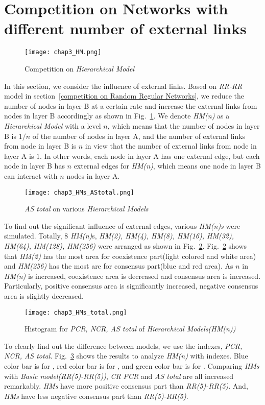 \section{Competition on Networks with different number of external links}
\begin{figure}[!htb]
	\centering
	\texttt{[image: chap3\_HM.png]}
	\caption{Competition on \textit{Hierarchical Model}}
	\label{chap3_HM}
\end{figure}
In this section, we consider the influence of external links. Based on \textit{RR-RR} model in section~\ref{competition on Random Regular Networks}, we reduce the number of nodes in layer B at a certain rate and increase the external links from nodes in layer B accordingly as shown in Fig.~\ref{chap3_HM}.  We denote \textit{HM(n)} as a \textit{Hierarchical Model} with a level $n$, which means that the number of nodes in layer B is $1/n$ of the number of nodes in layer A, and the number of external links from node in layer B is $n$ in view that the number of external links from node in layer A is $1$. In other words, each node in layer A has one external edge, but each node in layer B has $n$ external edges for \textit{HM(n)}, which means one node in layer B can interact with $n$ nodes in layer A.\\
\begin{figure}[!htb]
	\centering
	\texttt{[image: chap3\_HMs\_AStotal.png]}
	\caption{\textit{AS total} on various \textit{Hierarchical Models}}
	\label{chap3_HMs_AStotal}
\end{figure}
To find out the significant influence of external edges, various \textit{HM(n)s} were simulated.  Totally, $8$ \textit{HM(n)}s, \textit{HM(2), HM(4), HM(8), HM(16), HM(32), HM(64), HM(128), HM(256)} were arranged as shown in Fig.~\ref{chap3_HMs_AStotal}.  
Fig.~\ref{chap3_HMs_AStotal} shows that \textit{HM(2)} has the most area for coexistence part(light colored and white area) and \textit{HM(256)} has the most are for consensus part(blue and red area). As $n$ in \textit{HM(n)} is increased, coexistence area is decreased and consensus area is increased. Particularly, positive consensus area is significantly increased, negative consensus area is slightly decreased. \\
\begin{figure}[!htb]
	\centering
	\texttt{[image: chap3\_HMs\_total.png]}
	\caption{Histogram for \textit{PCR, NCR, AS total} of \textit{Hierarchical Models(HM(n))}}
	\label{chap3_HMs_total}
\end{figure}
To clearly find out the difference between models, we use the indexes, \textit{PCR, NCR, AS total}. Fig.~\ref{chap3_HMs_total} shows the results to analyze \textit{HM(n)} with indexes. Blue color bar is for , red color bar is for , and green color bar is for . Comparing \textit{HMs} with \textit{Basic model(RR(5)-RR(5))}, \textit{CR} \textit{PCR} and \textit{AS total} are all increased remarkably. \textit{HMs} have more positive consensus part than \textit{RR(5)-RR(5)}. And, \textit{HMs} have less negative consensus part than \textit{RR(5)-RR(5)}. \\ 

